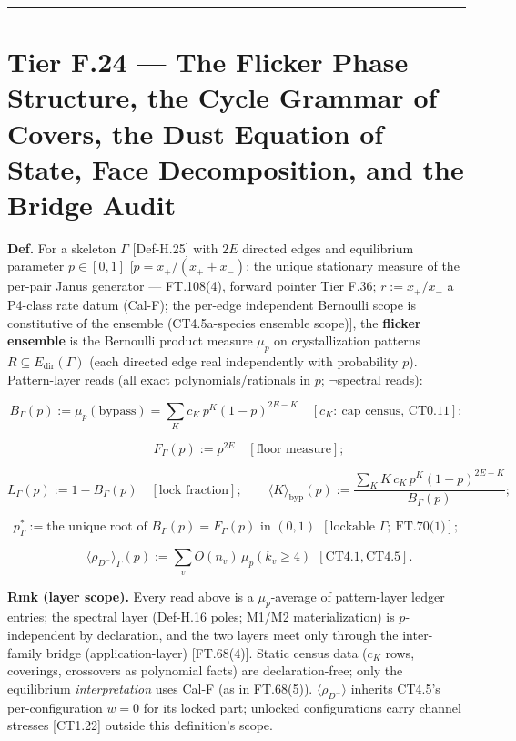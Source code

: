 \begin{theorem}
\vspace{2pt}\noindent\rule{\textwidth}{0.4pt}\vspace{2pt}

\end{theorem}

\section[Tier F.24 — The Flicker Phase Structure, the Cycle Grammar…]{\texorpdfstring{Tier F.24 — The Flicker Phase Structure, the Cycle Grammar of Covers, the Dust Equation of State, Face Decomposition, and the Bridge Audit}{Tier F.24 - The Flicker Phase Structure, the Cycle Grammar of Covers, the Dust Equation of State, Face Decomposition, and the Bridge Audit}}

\begin{definition}\label{tag:Def-H-26}
\textbf{Def.} For a skeleton $\Gamma$ [Def-H.25] with $2E$ directed edges and equilibrium parameter $p\in[0,1]$ [$p=x_+/(x_++x_-)$: the unique stationary measure of the per-pair Janus generator — FT.108(4), forward pointer Tier F.36; $r:=x_+/x_-$ a P4-class rate datum (Cal-F); the per-edge independent Bernoulli scope is constitutive of the ensemble (CT4.5a-species ensemble scope)], the \textbf{flicker ensemble} is the Bernoulli product measure $\mu_p$ on crystallization patterns $R\subseteq E_{\mathrm{dir}}(\Gamma)$ (each directed edge real independently with probability $p$). Pattern-layer reads (all exact polynomials/rationals in $p$; $\neg$spectral reads):

\[
B_\Gamma(p):=\mu_p(\text{bypass})=\sum_K c_K\,p^K(1-p)^{2E-K}\quad[c_K:\ \text{cap census, CT0.11}];
\]

\[
\qquad F_\Gamma(p):=p^{2E}\quad[\text{floor measure}];
\]

\[
L_\Gamma(p):=1-B_\Gamma(p)\quad[\text{lock fraction}];\qquad \langle K\rangle_{\mathrm{byp}}(p):=\frac{\sum_K K\,c_K\,p^K(1-p)^{2E-K}}{B_\Gamma(p)};
\]

\[
p^*_\Gamma:=\text{the unique root of }B_\Gamma(p)=F_\Gamma(p)\text{ in }(0,1)\ \ [\text{lockable }\Gamma;\ \text{FT.70(1)}];
\]

\[
\qquad \langle\rho_{D^-}\rangle_\Gamma(p):=\sum_v O(n_v)\,\mu_p(k_v\ge4)\ \ [\mathrm{CT4.1},\mathrm{CT4.5}].
\]

\textbf{Rmk (layer scope).} Every read above is a $\mu_p$-average of pattern-layer ledger entries; the spectral layer (Def-H.16 poles; M1/M2 materialization) is $p$-independent by declaration, and the two layers meet only through the inter-family bridge (application-layer) [FT.68(4)]. Static census data ($c_K$ rows, coverings, crossovers as polynomial facts) are declaration-free; only the equilibrium \textit{interpretation} uses Cal-F (as in FT.68(5)). $\langle\rho_{D^-}\rangle$ inherits CT4.5's per-configuration $w=0$ for its locked part; unlocked configurations carry channel stresses [CT1.22] outside this definition's scope.


\end{definition}

